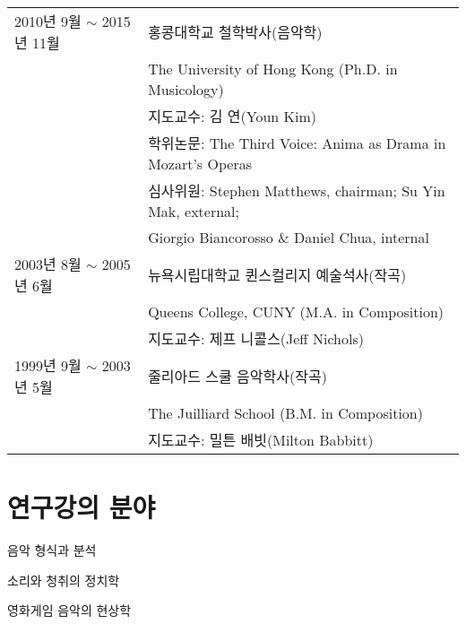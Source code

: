 \documentclass[a4paper,10pt,draft]{article}
\begin{document}
  \hspace*{-0.25cm}
  \begin{tabular}{p{4.0cm} p{10.0cm}}
    2010년 9월 $\sim$ 2015년 11월 & 홍콩대학교 철학박사(음악학)\\
    & The University of Hong Kong (Ph.D. in Musicology)\\
    & 지도교수: 김 연(Youn Kim)\\
    & 학위논문: The Third Voice: Anima as Drama in Mozart’s Operas\\
    & 심사위원: Stephen Matthews, chairman; Su Yin Mak, external;\\
    & \hspace*{14mm} Giorgio Biancorosso \& Daniel Chua, internal\\[2mm]
    
%    
	2003년 8월 $\sim$ 2005년 6월 & 뉴욕시립대학교 퀸스컬리지 예술석사(작곡)\\
    & Queens College, CUNY (M.A. in Composition)\\
	& 지도교수: 제프 니콜스(Jeff Nichols)\\[2mm]

    1999년 9월 $\sim$ 2003년 5월 & 줄리아드 스쿨 음악학사(작곡)\\
    & The Juilliard School (B.M. in Composition)\\
    & 지도교수: 밀튼 배빗(Milton Babbitt)
  \end{tabular}
  
  \vspace{5mm}
  
  \section*{\normalsize 연구\textperiodcentered 강의 분야}
  
  \noindent \hspace{2mm} \textbullet \hspace{2mm} 음악 형식과 분석
  
  \noindent \hspace{2mm} \textbullet \hspace{2mm} 소리와 청취의 정치학
  
  \noindent \hspace{2mm} \textbullet \hspace{2mm} 영화\textperiodcentered 게임 음악의 현상학
  
\end{document}

